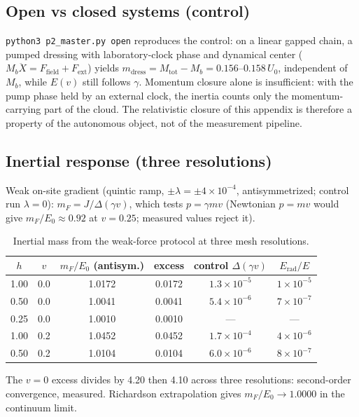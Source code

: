 \documentclass[11pt,a4paper]{article}
\theoremstyle{plain}
\theoremstyle{remark}
\begin{document}
\subsection{Open vs closed systems (control)}
\label{app:breathers_open}
\texttt{python3 p2\_master.py open} reproduces the control: on a linear gapped chain, a pumped dressing with laboratory-clock phase and dynamical center ($M_b\ddot X = F_{\text{field}} + F_{\text{ext}}$) yields $m_{\text{dress}} = M_{\text{tot}} - M_b = 0.156$--$0.158\,U_0$, independent of $M_b$, while $E(v)$ still follows $\gamma$. Momentum closure alone is insufficient: with the pump phase held by an external clock, the inertia counts only the momentum-carrying part of the cloud. The relativistic closure of this appendix is therefore a property of the autonomous object, not of the measurement pipeline.

\subsection{Inertial response (three resolutions)}
\label{app:breathers_force}
Weak on-site gradient (quintic ramp, $\pm\lambda = \pm 4\times10^{-4}$, antisymmetrized; control run $\lambda = 0$): $m_F = J/\Delta(\gamma v)$, which tests $p = \gamma m v$ (Newtonian $p = mv$ would give $m_F/E_0 \approx 0.92$ at $v = 0.25$; measured values reject it).

\begin{table}[htbp]
\centering\small
\begin{tabular}{cccccc}
\toprule
$h$ & $v$ & $m_F/E_0$ (antisym.) & excess & control $\Delta(\gamma v)$ & $E_{\text{rad}}/E$ \\
\midrule
1.00 & 0.0 & 1.0172 & 0.0172 & $1.3\times10^{-5}$ & $1\times10^{-5}$ \\
0.50 & 0.0 & 1.0041 & 0.0041 & $5.4\times10^{-6}$ & $7\times10^{-7}$ \\
0.25 & 0.0 & 1.0010 & 0.0010 & --- & --- \\
1.00 & 0.2 & 1.0452 & 0.0452 & $1.7\times10^{-4}$ & $4\times10^{-6}$ \\
0.50 & 0.2 & 1.0104 & 0.0104 & $6.0\times10^{-6}$ & $8\times10^{-7}$ \\
\bottomrule
\end{tabular}
\caption{Inertial mass from the weak-force protocol at three mesh resolutions.}
\label{tab:breather_force}
\end{table}

The $v = 0$ excess divides by 4.20 then 4.10 across three resolutions: second-order convergence, measured. Richardson extrapolation gives $m_F/E_0 \to 1.0000$ in the continuum limit.
\end{document}
